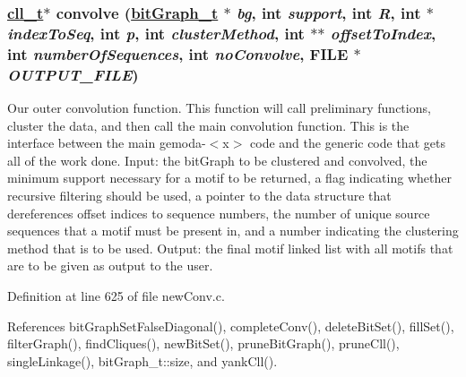 \hypertarget{gemoda-s_8c_a5}{
\subsubsection[convolve]{\setlength{\rightskip}{0pt plus 5cm}\hyperlink{structcnode}{cll\_\-t}$\ast$ convolve (\hyperlink{structbitGraph__t}{bit\-Graph\_\-t} $\ast$ {\em bg}, int {\em support}, int {\em R}, int $\ast$ {\em index\-To\-Seq}, int {\em p}, int {\em cluster\-Method}, int $\ast$$\ast$ {\em offset\-To\-Index}, int {\em number\-Of\-Sequences}, int {\em no\-Convolve}, FILE $\ast$ {\em OUTPUT\_\-FILE})}}
\label{gemoda-s_8c_a5}


Our outer convolution function. This function will call preliminary functions, cluster the data, and then call the main convolution function. This is the interface between the main gemoda-$<$x$>$ code and the generic code that gets all of the work done. Input: the bit\-Graph to be clustered and convolved, the minimum support necessary for a motif to be returned, a flag indicating whether recursive filtering should be used, a pointer to the data structure that dereferences offset indices to sequence numbers, the number of unique source sequences that a motif must be present in, and a number indicating the clustering method that is to be used. Output: the final motif linked list with all motifs that are to be given as output to the user.

Definition at line 625 of file new\-Conv.c.

References bit\-Graph\-Set\-False\-Diagonal(), complete\-Conv(), delete\-Bit\-Set(), fill\-Set(), filter\-Graph(), find\-Cliques(), new\-Bit\-Set(), prune\-Bit\-Graph(), prune\-Cll(), single\-Linkage(), bit\-Graph\_\-t::size, and yank\-Cll().

